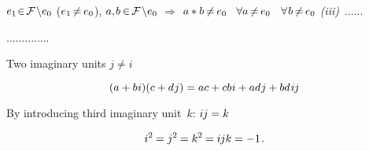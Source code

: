  
${e_{1} {\hspace{.2ex} \in \hspace{.3ex}} \mathcal{F} \hspace{-0.3ex} \setminus \hspace{-0.5ex} e_{0}}$
(${e_{1} \hspace{-0.3ex} \neq \hspace{-0.2ex} e_{0}}$),
${a, \hspace{-0.2ex} b \hspace{-0.2ex} \in \hspace{-0.3ex} \mathcal{F} \hspace{-0.3ex} \setminus \hspace{-0.5ex} e_{0}}$
$\Rightarrow$
${a * b \hspace{-0.2ex} \neq \hspace{-0.2ex} e_{0}}$
~${\forall a {\hspace{.4ex} \neq \hspace{.4ex}} e_{0}}$
~${\forall \hspace{.2ex} b {\hspace{.4ex} \neq \hspace{.4ex}} e_{0}}$
\textit{(iii)}~......


..............

Two imaginary units
${j \neq i}$

\begin{equation*}
( a + b \hspace{.1ex} i ) ( c + d \hspace{.1ex} j )
= ac + cb \hspace{.1ex} i + ad \hspace{.1ex} j + bd \hspace{.2ex} i \hspace{-0.1ex} j
\end{equation*}

By introducing
third
imaginary unit~$k$\::
${i \hspace{-0.1ex} j = k}$

\begin{equation}\label{theformulaforquaternions}
i^2 \hspace{-0.1ex} = j^2 \hspace{-0.1ex} = k^2 \hspace{-0.1ex} = i \hspace{-0.1ex} j k = -1
\hspace{.2ex} .
\end{equation}

